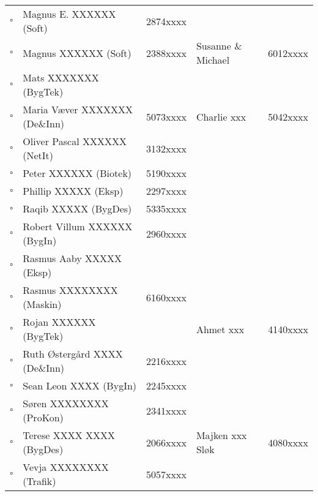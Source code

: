 \begin{table}
{\begin{tabu}{c L{6cm} r l R{5em}}
$\square$ & Magnus E. XXXXXX (Soft)  & 2874xxxx &                       &   \\
$\square$ & Magnus XXXXXX (Soft)            & 2388xxxx & Susanne \& Michael    & 6012xxxx  \\
$\square$ & Mats XXXXXXX (BygTek)               &          &                       &   \\
$\square$ & Maria Væver XXXXXXX (De\&Inn)         & 5073xxxx & Charlie xxx         & 5042xxxx  \\
$\square$ & Oliver Pascal XXXXXX (NetIt)        & 3132xxxx &                       &   \\
$\square$ & Peter XXXXXX (Biotek)                 & 5190xxxx &                       &   \\
$\square$ & Phillip XXXXX (Eksp)                & 2297xxxx &                       &   \\
$\square$ & Raqib XXXXX (BygDes)               & 5335xxxx &                       &   \\
$\square$ & Robert Villum XXXXXX (BygIn)      & 2960xxxx &                       &   \\
$\square$ & Rasmus Aaby XXXXX (Eksp)           &          &                       &   \\
$\square$ & Rasmus XXXXXXXX (Maskin)             & 6160xxxx &                       &   \\
$\square$ & Rojan XXXXXX (BygTek)                &          & Ahmet xxx           & 4140xxxx  \\
$\square$ & Ruth Østergård XXXX (De\&Inn)     & 2216xxxx &                       &   \\
$\square$ & Sean Leon XXXX (BygIn)              & 2245xxxx &                       &   \\
$\square$ & Søren XXXXXXXX (ProKon)           & 2341xxxx &                       &   \\
$\square$ & Terese XXXX XXXX (BygDes)     & 2066xxxx & Majken xxx Sløk    & 4080xxxx  \\
$\square$ & Vevja XXXXXXXX (Trafik)          & 5057xxxx &                       &   \\
\end{tabu}}
\end{table}